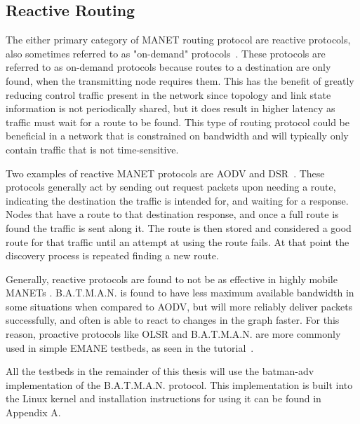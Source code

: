 \subsection{Reactive Routing}
The either primary category of MANET routing protocol are reactive protocols, also sometimes referred to as "on-demand" protocols~\cite{manet_survey}.
These protocols are referred to as on-demand protocols because routes to a destination are only found, when the transmitting node requires them.
This has the benefit of greatly reducing control traffic present in the network since topology and link state information is not periodically shared, but it does result in higher latency as traffic must wait for a route to be found.
This type of routing protocol could be beneficial in a network that is constrained on bandwidth and will typically only contain traffic that is not time-sensitive. \par
Two examples of reactive MANET protocols are AODV and DSR~\cite{reactive_routing}.
These protocols generally act by sending out request packets upon needing a route, indicating the destination the traffic is intended for, and waiting for a response.
Nodes that have a route to that destination response, and once a full route is found the traffic is sent along it.
The route is then stored and considered a good route for that traffic until an attempt at using the route fails.
At that point the discovery process is repeated finding a new route. \par
Generally, reactive protocols are found to not be as effective in highly mobile MANETs \cite{aodv_batman,reactive_routing}.
B.A.T.M.A.N. is found to have less maximum available bandwidth in some situations when compared to AODV, but will more reliably deliver packets successfully, and often is able to react to changes in the graph faster.
For this reason, proactive protocols like OLSR and B.A.T.M.A.N. are more commonly used in simple EMANE testbeds, as seen in the tutorial~\cite{emane_tutorial}. \par
All the testbeds in the remainder of this thesis will use the batman-adv implementation of the B.A.T.M.A.N. protocol.
This implementation is built into the Linux kernel and installation instructions for using it can be found in Appendix A. %

